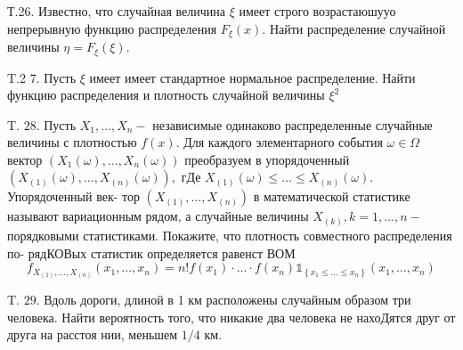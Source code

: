 \documentclass[a4paper,12pt]{article} %
\begin{document}
\begin{example}

Т.26. Известно, что случайная величина $\xi$ имеет строго возрастаюшууо непрерывную функцию распределения $F_{\xi}(x) .$ Найти распределение случайной величины $\eta=F_{\xi}(\xi) .$




\end{example}





\begin{example}

T.2 7. Пусть $\xi$ имеет имеет стандартное нормальное распределение. Найти функцию распределения и плотность случайной величины $\xi^{2}$




\end{example}



\begin{example}

T. $28 .$ Пусть $X_{1}, \ldots, X_{n}-$ независимые одинаково распределенные случайные величины с плотностью $f(x) .$ Для каждого элементарного события $\omega \in \Omega$ вектор $\left(X_{1}(\omega), \ldots, X_{n}(\omega)\right)$ преобразуем в упорядоченный $\left(X_{(1)}(\omega), \ldots, X_{(n)}(\omega)\right),$ гДе $X_{(1)}(\omega) \leq \ldots \leq X_{(n)}(\omega) .$ Упорядоченный век-
тор $\left(X_{(1)}, \ldots, X_{(n)}\right)$ в математической статистике называют вариационным рядом, а случайные величины $X_{(k)}, k=1, \ldots, n-$ порядковыми статистиками. Покажите, что плотность совместного распределения по-
рядКОВых статистик определяется равенст ВОМ
$$
f_{X_{(1)}, \ldots, X_{(n)}}\left(x_{1}, \ldots, x_{n}\right)=n ! f\left(x_{1}\right) \cdot \ldots \cdot f\left(x_{n}\right) \mathbb{1}_{\left\{x_{1} \leq \ldots \leq x_{n}\right\}}\left(x_{1}, \ldots, x_{n}\right)
$$




\end{example}



\begin{example}


T. $29 .$ Вдоль дороги, длиной в 1 км расположены случайным образом три человека. Найти вероятность того, что никакие два человека не нахоДятся друг от друга на расстоя нии, меньшем $1 / 4$ км.



\end{example}
\end{document}
